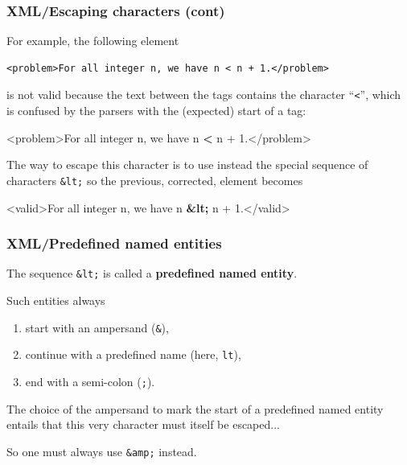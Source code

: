 %
\begin{frame}[containsverbatim]
\frametitle{XML/Escaping characters (cont)}

For example, the following element
{\small
\begin{verbatim}
<problem>For all integer n, we have n < n + 1.</problem>
\end{verbatim}
}
is not valid because the text between the tags contains the character
``\texttt{<}'', which is confused by the \XML parsers with the (expected)
start of a tag:
{\small
\begin{semiverbatim}
<problem>For all integer n, we have n \textbf{<} n + 1.</problem>
\end{semiverbatim}
}
The \XML way to escape this character is to use instead the special
sequence of characters \verb|&lt;| so the previous, corrected, element
becomes
{\small
\begin{semiverbatim}
<valid>For all integer n, we have n \textbf{&lt;} n + 1.</valid>
\end{semiverbatim}
}

\end{frame}

%
\begin{frame}[containsverbatim]
\frametitle{XML/Predefined named entities}

The sequence \verb|&lt;| is called a \textbf{predefined named entity}.

\bigskip

Such entities always
\begin{enumerate}

  \item start with an ampersand (\verb|&|),

  \item continue with a predefined name (here, \texttt{lt}),

  \item end with a semi-colon (\texttt{;}).

\end{enumerate}
The choice of the ampersand to mark the start of a predefined named
entity entails that this very character must itself be escaped...

\bigskip

So one must always use \verb|&amp;| instead.

\end{frame}

